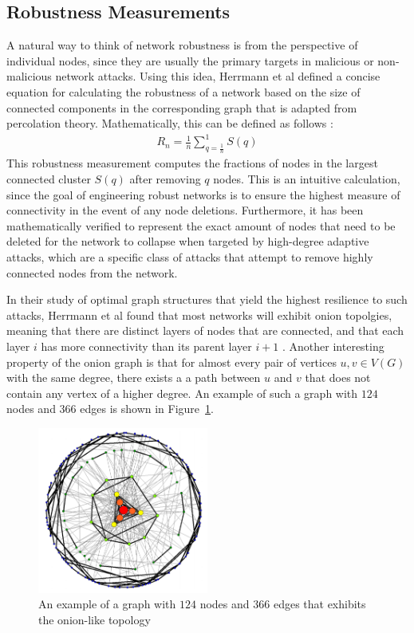 \documentclass[11pt]{article}
\begin{document}
\subsection{Robustness Measurements}
A natural way to think of network robustness is from the perspective of individual nodes, since they are 
usually the primary targets in malicious or non-malicious network attacks. Using this idea, Herrmann et al
defined a concise equation for calculating the robustness of a network based on the size of connected
components in the corresponding graph that is adapted from percolation theory. Mathematically, this can be defined as follows \cite{Onion}:
\begin{eqnarray*}
R_{n} = \frac{1}{n}\sum_{q=\frac{1}{n}}^{1}S(q)
\end{eqnarray*}
This robustness measurement computes the fractions of nodes in the largest connected cluster $S(q)$ after removing $q$ nodes. This is an intuitive calculation, since the goal of engineering robust networks is to ensure the highest measure of connectivity in the event of any node deletions. Furthermore, it has been mathematically verified to represent the exact amount of nodes that need to be deleted for the network to collapse when targeted by high-degree adaptive attacks, which are a specific class of attacks that attempt to remove highly connected nodes from the network. 

In their study of optimal graph structures that yield the highest resilience to such attacks, Herrmann et al found that most networks will exhibit onion topolgies, meaning that there are distinct layers of nodes that are connected, and that each layer $i$ has more connectivity than its parent layer $i+1$ \cite{Onion}. Another interesting property of the onion graph is that for almost every pair of vertices $u, v \in V(G)$ with the same degree, there exists a a path between $u$ and $v$ that does not contain any vertex of a higher degree. An example of such a graph with $124$ nodes and $366$ edges is shown in Figure~\ref{fig:Onion}.

\begin{figure}[h!]
	\label{fig:Onion}
	\centering
		\includegraphics[width=0.5\textwidth]{Onion.jpg}
	\caption{An example of a graph with $124$ nodes and $366$ edges that exhibits the onion-like topology \cite{Onion}}
\end{figure}
\end{document}
